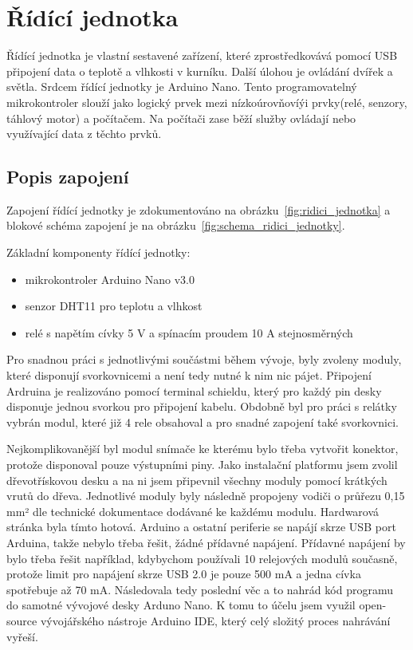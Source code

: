 \section{Řídící jednotka}\label{sec:ridici-jednotka}
Řídící jednotka je vlastní sestavené zařízení, které zprostředkovává pomocí USB připojení data o teplotě a vlhkosti v kurníku.
Další úlohou je ovládání dvířek a světla.
Srdcem řídící jednotky je Arduino Nano.
Tento programovatelný mikrokontroler slouží jako logický prvek mezi nízkoúrovňovíýi prvky(relé, senzory, táhlový motor) a počítačem.
Na počítači zase běží služby ovládají nebo využívající data z těchto prvků.

\subsection*{Popis zapojení}
Zapojení řídící jednotky je zdokumentováno na obrázku~\ref{fig:ridici_jednotka} a blokové schéma zapojení je na obrázku~\ref{fig:schema_ridici_jednotky}.

Základní komponenty řídící jednotky:
\begin{itemize}
    \item mikrokontroler Arduino Nano v3.0
    \item senzor DHT11 pro teplotu a vlhkost
    \item relé s napětím cívky 5 V a spínacím proudem 10 A stejnosměrných
\end{itemize}
Pro snadnou práci s jednotlivými součástmi během vývoje, byly zvoleny moduly, které disponují svorkovnicemi a není tedy nutné k nim nic pájet.
Připojení Ardruina je realizováno pomocí terminal schieldu, který pro každý pin desky disponuje jednou svorkou pro připojení kabelu.
Obdobně byl pro práci s relátky vybrán modul, které již 4 rele obsahoval a pro snadné zapojení také svorkovnici.

Nejkomplikovanější byl modul snímače ke kterému bylo třeba vytvořit konektor, protože disponoval pouze výstupními piny.
Jako instalační platformu jsem zvolil dřevotřískovou desku a na ni jsem připevnil všechny moduly pomocí krátkých vrutů do dřeva.
Jednotlivé moduly byly následně propojeny vodiči o průřezu 0,15 mm² dle technické dokumentace dodávané ke každému modulu.
Hardwarová stránka byla tímto hotová.
\newline
Arduino a ostatní periferie se napájí skrze USB port Arduina, takže nebylo třeba řešit, žádné přídavné napájení.
Přídavné napájení by bylo třeba řešit například, kdybychom používali 10 relejových modulů současně, protože limit pro napájení skrze USB 2.0 je pouze 500 mA a jedna cívka spotřebuje až 70 mA.\newline
Následovala tedy poslední věc a to nahrád kód programu do samotné vývojové desky Arduno Nano.
K tomu to účelu jsem využil open-source vývojářského nástroje Arduino IDE, který celý složitý proces nahrávání vyřeší.

